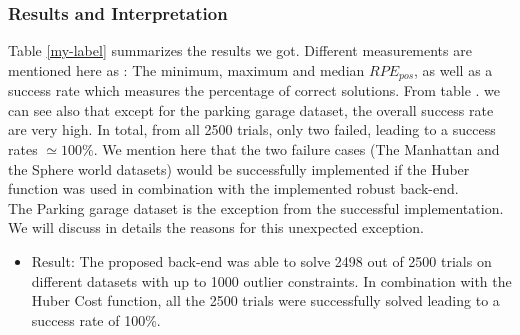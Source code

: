\documentclass[9pt,technote]{IEEEtran}
\begin{document}
\subsubsection{Results and Interpretation}
Table \ref{my-label} summarizes the results we got.
Different measurements are mentioned here as : The minimum, maximum and median $RPE_{pos}$, as well as a success rate which measures the percentage of correct solutions.   
From table . we can see also that except for the parking garage dataset, the overall success rate are very high.
In total, from all 2500 trials, only two failed, leading to a success rates $ \simeq 100\%$.
We mention here that the two failure cases (The Manhattan and the Sphere world datasets) would be successfully implemented if the Huber function was used in combination with the implemented robust back-end.\\
The Parking garage dataset is the exception from the successful implementation. We will discuss in details the reasons for this unexpected exception.

\begin{itemize}
\item Result: The proposed back-end was able to solve 2498 out of 2500 trials on different datasets with up to 1000 outlier constraints. In combination with the Huber Cost function, all the 2500 trials were successfully solved leading to a success rate of 100\%.
\end{itemize}
\begin{table}[h]
\centering

\caption{Overall $RPE_{pos}$ metric for the different datasets, with...1000 outliers and 500 trials per dataset.}
\label{my-label}
\end{table}
\end{document}
